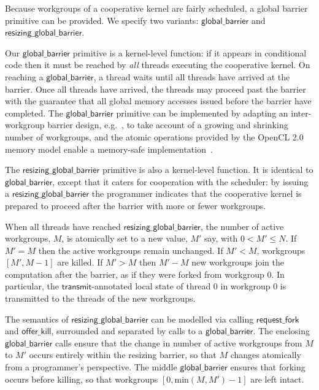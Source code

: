 \documentclass[sigconf]{acmart}
\newcommand{\transmit}{\mathsf{transmit}}
\newcommand{\offerfork}{\mathsf{request\_fork}}
\newcommand{\offerkill}{\mathsf{offer\_kill}}
\newcommand{\globalbarrier}{\mathsf{global\_barrier}}
\newcommand{\resizingglobalbarrier}{\mathsf{resizing\_global\_barrier}}
\begin{document}
{%
%
Because workgroups of a cooperative kernel are fairly scheduled, a
global barrier primitive can be provided.  We specify two variants: $\globalbarrier$
and $\resizingglobalbarrier$.

Our $\globalbarrier$ primitive is a kernel-level function: if it
appears in conditional code then it must be reached by \emph{all}
threads executing the cooperative kernel.  On reaching a
$\globalbarrier$, a thread waits until all threads have arrived at
the barrier.  Once all threads have arrived, the threads may proceed
past the barrier with the guarantee that all global memory accesses
issued before the barrier have completed.  The $\globalbarrier$
primitive can be implemented by adapting an inter-workgroup barrier
design, e.g.~\cite{XF10}, to take account of a growing and shrinking number of workgroups, and the atomic operations provided by
the OpenCL 2.0 memory model enable a memory-safe
implementation~\cite{DBLP:conf/oopsla/SorensenDBGR16}.

The $\resizingglobalbarrier$ primitive is also a kernel-level
function.  It is identical to $\globalbarrier$, except that it caters
for cooperation with the scheduler: by issuing a
$\resizingglobalbarrier$ the programmer indicates that the cooperative
kernel is prepared to proceed after the barrier with more or fewer workgroups.

When all threads have reached $\resizingglobalbarrier$,
the number of active workgroups, $M$, is atomically set to a new value, $M'$ say, with $0 < M' \leq N$.
If $M' = M$ then the active workgroups remain unchanged.  If $M' < M$, workgroups $[M', M-1]$ are
killed.  If $M' > M$ then $M'-M$ new workgroups join the computation after the barrier,
as if they were forked from workgroup 0.  In particular, the
$\transmit$-annotated local state of thread 0 in workgroup 0 is
transmitted to the threads of the new workgroups.

The semantics of $\resizingglobalbarrier$ can be modelled via calling $\offerfork$ and $\offerkill$,
surrounded and separated by calls to a $\globalbarrier$.
%
%
The enclosing $\globalbarrier$ calls ensure that the change in number
of active workgroups from $M$ to $M'$ occurs entirely within the
resizing barrier, so that $M$ changes atomically from a programmer's perspective.  The middle $\globalbarrier$ ensures that forking occurs
before killing, so that workgroups $[0, \textrm{min}(M, M') - 1]$ are
left intact.

}
\end{document}
